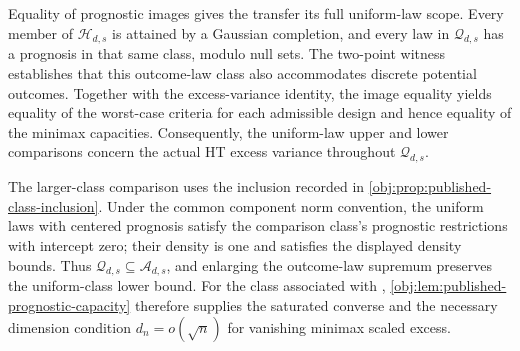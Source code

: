 Equality of prognostic images gives the transfer its full uniform-law scope. Every member of \(\mathcal H_{d,s}\) is attained by a Gaussian completion, and every law in \(\mathcal Q_{d,s}\) has a prognosis in that same class, modulo null sets. The two-point witness establishes that this outcome-law class also accommodates discrete potential outcomes. Together with the excess-variance identity, the image equality yields equality of the worst-case criteria for each admissible design and hence equality of the minimax capacities. Consequently, the uniform-law upper and lower comparisons concern the actual HT excess variance throughout \(\mathcal Q_{d,s}\).

The larger-class comparison uses the inclusion recorded in \cref{obj:prop:published-class-inclusion}. Under the common component norm convention, the uniform laws with centered prognosis satisfy the comparison class's prognostic restrictions with intercept zero; their density is one and satisfies the displayed density bounds. Thus \(\mathcal Q_{d,s}\subseteq\mathcal A_{d,s}\), and enlarging the outcome-law supremum preserves the uniform-class lower bound. For the class associated with \citet[Theorem B.8(ii)]{Cytrynbaum2026Limits}, \cref{obj:lem:published-prognostic-capacity} therefore supplies the saturated converse and the necessary dimension condition \(d_n=o(\sqrt n)\) for vanishing minimax scaled excess.

